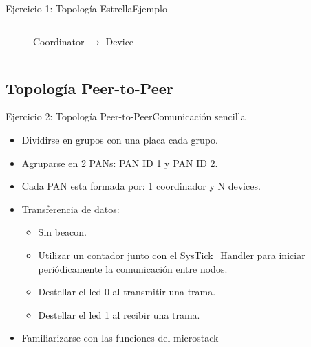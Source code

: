 \documentclass[aspectratio=169,handout]{beamer}
\begin{document}
\begin{frame}[t]{Ejercicio 1: Topología Estrella}{Ejemplo}
\begin{columns}[t]
\begin{column}{.5\textwidth}
\begin{minipage}[t][0.7\textheight][s]{\columnwidth}
\begin{figure}[H]
                \vfill
                \caption{Coordinator $\rightarrow$ Device}
            \end{figure}            
        \end{minipage}
    \end{column}
\end{columns}          
\end{frame}



\subsection[Peer-to-Peer]{Topología Peer-to-Peer}
\begin{frame}[t]{Ejercicio 2: Topología Peer-to-Peer}{Comunicación sencilla}
    \begin{itemize}
        \item Dividirse en grupos con una placa cada grupo.
        \vspace{5px}
        \item Agruparse en 2 PANs: PAN ID 1 y PAN ID 2.
        \vspace{5px}
        \item Cada PAN esta formada por: 1 coordinador y N devices.
        \vspace{5px}
        \item Transferencia de datos:
            \begin{itemize}
            \item Sin beacon.
            \vspace{5px}
            \item Utilizar un contador junto con el SysTick{\_}Handler para iniciar periódicamente la comunicación entre nodos. 
            \vspace{5px}   
            \item Destellar el led 0 al transmitir una trama.
            \vspace{5px}
            \item Destellar el led 1 al recibir una trama.
            \end{itemize}
		\vspace{5px}
        \item Familiarizarse con las funciones del microstack
        \vspace{5px}
    \end{itemize}
\end{frame}
\end{document}
